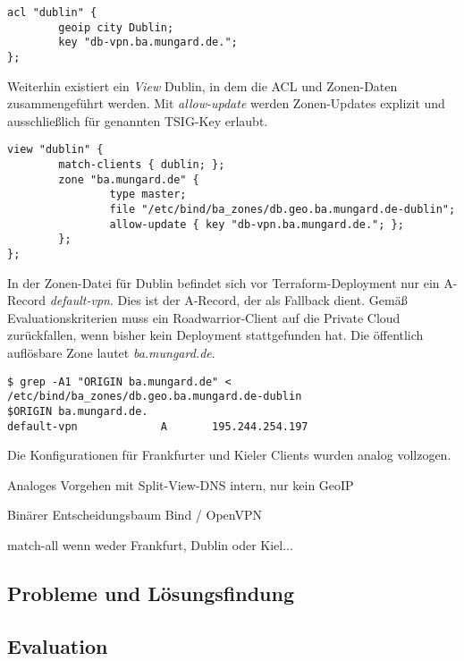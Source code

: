\begin{lstlisting}[label=acl-geoip-bind,caption=.]
acl "dublin" {
        geoip city Dublin;
        key "db-vpn.ba.mungard.de.";
};
\end{lstlisting}

Weiterhin existiert ein \textit{View} \glqq Dublin\grqq{}, in dem die ACL und Zonen-Daten zusammengeführt werden. Mit \textit{allow-update} werden Zonen-Updates explizit und ausschließlich für genannten TSIG-Key erlaubt.

\begin{lstlisting}[label=view-geoip-bind,caption=.]
view "dublin" {
        match-clients { dublin; };
        zone "ba.mungard.de" {
                type master;
                file "/etc/bind/ba_zones/db.geo.ba.mungard.de-dublin";
                allow-update { key "db-vpn.ba.mungard.de."; };
        };
};
\end{lstlisting}

In der Zonen-Datei für Dublin befindet sich vor Terraform-Deployment nur ein A-Record \textit{default-vpn}. Dies ist der A-Record, der als Fallback dient. Gemäß Evaluationskriterien muss ein Roadwarrior-Client auf die Private Cloud zurückfallen, wenn bisher kein Deployment stattgefunden hat. Die öffentlich auflösbare Zone lautet \textit{ba.mungard.de}.

\begin{lstlisting}[label=zone-dublin-before-deployment,caption=Die Zone ba.mungard.de vor dem Terraform-Deployment.]
$ grep -A1 "ORIGIN ba.mungard.de" < /etc/bind/ba_zones/db.geo.ba.mungard.de-dublin
$ORIGIN ba.mungard.de.
default-vpn             A       195.244.254.197
\end{lstlisting}

Die Konfigurationen für Frankfurter und Kieler Clients wurden analog vollzogen.

Analoges Vorgehen mit Split-View-DNS intern, nur kein GeoIP

Binärer Entscheidungsbaum Bind / OpenVPN

match-all wenn weder Frankfurt, Dublin oder Kiel...






\subsection{Probleme und Lösungsfindung}
\subsection{Evaluation}

